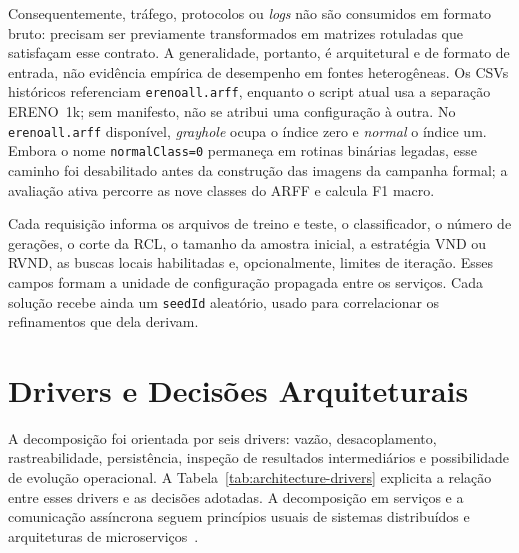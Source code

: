 Consequentemente, tráfego, protocolos ou \textit{logs} não são consumidos em formato bruto: precisam ser previamente transformados em matrizes rotuladas que satisfaçam esse contrato. A generalidade, portanto, é arquitetural e de formato de entrada, não evidência empírica de desempenho em fontes heterogêneas. Os CSVs históricos referenciam \texttt{erenoall.arff}, enquanto o script atual usa a separação ERENO~1k; sem manifesto, não se atribui uma configuração à outra. No \texttt{erenoall.arff} disponível, \textit{grayhole} ocupa o índice zero e \textit{normal} o índice um. Embora o nome \texttt{normalClass=0} permaneça em rotinas binárias legadas, esse caminho foi desabilitado antes da construção das imagens da campanha formal; a avaliação ativa percorre as nove classes do ARFF e calcula F1 macro.

Cada requisição informa os arquivos de treino e teste, o classificador, o número de gerações, o corte da RCL, o tamanho da amostra inicial, a estratégia VND ou RVND, as buscas locais habilitadas e, opcionalmente, limites de iteração. Esses campos formam a unidade de configuração propagada entre os serviços. Cada solução recebe ainda um \texttt{seedId} aleatório, usado para correlacionar os refinamentos que dela derivam.

\section{Drivers e Decisões Arquiteturais}

A decomposição foi orientada por seis drivers: vazão, desacoplamento, rastreabilidade, persistência, inspeção de resultados intermediários e possibilidade de evolução operacional. A Tabela~\ref{tab:architecture-drivers} explicita a relação entre esses drivers e as decisões adotadas. A decomposição em serviços e a comunicação assíncrona seguem princípios usuais de sistemas distribuídos e arquiteturas de microserviços~\cite{Tanenbaum2007Distributed,Newman2021,Kreps2011}.

